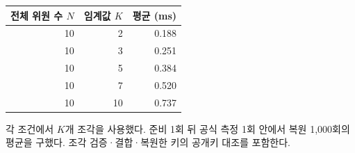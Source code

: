 \begin{center}
\begin{minipage}{\columnwidth}
\centering\small\captionsetup{hypcap=false}
\label{tab:eval-key}
\begin{tabular*}{\columnwidth}{@{\extracolsep{\fill}}rrr@{}}
\toprule
전체 위원 수 $N$ & 임계값 $K$ & 평균 (ms) \\ \midrule
10 & 2 & 0.188 \\
10 & 3 & 0.251 \\
10 & 5 & 0.384 \\
10 & 7 & 0.520 \\
10 & 10 & 0.737 \\
\bottomrule
\end{tabular*}
\par\smallskip\begin{minipage}{\columnwidth}\footnotesize 각 조건에서 $K$개 조각을 사용했다. 준비 1회 뒤 공식 측정 1회 안에서 복원 1,000회의 평균을 구했다. 조각 검증·결합·복원한 키의 공개키 대조를 포함한다.\end{minipage}
\end{minipage}
\end{center}
